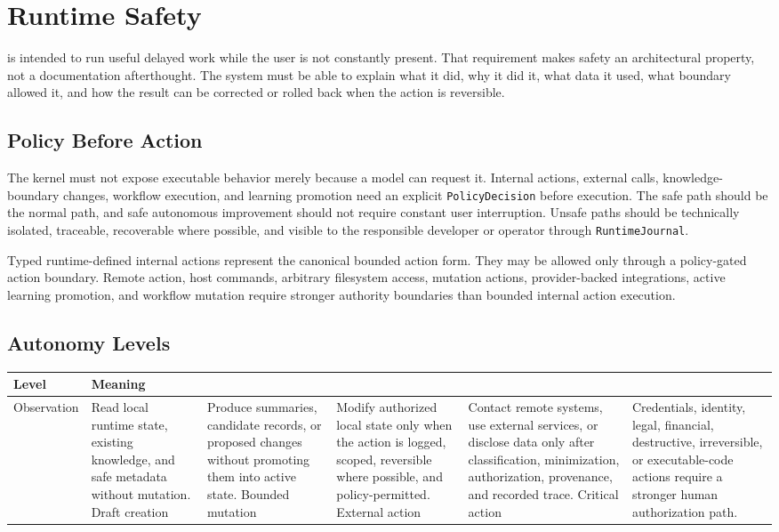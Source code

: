 

\section{Runtime Safety}

\Madre is intended to run useful delayed work while the user is not constantly present. That requirement makes safety an architectural property, not a documentation afterthought. The system must be able to explain what it did, why it did it, what data it used, what boundary allowed it, and how the result can be corrected or rolled back when the action is reversible.

\subsection{Policy Before Action}

The kernel must not expose executable behavior merely because a model can request it. Internal actions, external calls, knowledge-boundary changes, workflow execution, and learning promotion need an explicit \texttt{PolicyDecision} before execution. The safe path should be the normal path, and safe autonomous improvement should not require constant user interruption. Unsafe paths should be technically isolated, traceable, recoverable where possible, and visible to the responsible developer or operator through \texttt{RuntimeJournal}.

Typed runtime-defined internal actions represent the canonical bounded action form. They may be allowed only through a policy-gated action boundary. Remote action, host commands, arbitrary filesystem access, mutation actions, provider-backed integrations, active learning promotion, and workflow mutation require stronger authority boundaries than bounded internal action execution.

\subsection{Autonomy Levels}

\begin{tabularx}{.95\linewidth}{@{}lX@{}}
	\toprule
	\textbf{Level} & \textbf{Meaning} \\
	\midrule
	Observation & Read local runtime state, existing knowledge, and safe metadata without mutation. \n
	Draft creation & Produce summaries, candidate records, or proposed changes without promoting them into active state. \n
	Bounded mutation & Modify authorized local state only when the action is logged, scoped, reversible where possible, and policy-permitted. \n
	External action & Contact remote systems, use external services, or disclose data only after classification, minimization, authorization, provenance, and recorded trace. \n
	Critical action & Credentials, identity, legal, financial, destructive, irreversible, or executable-code actions require a stronger human authorization path. \\
	\bottomrule
\end{tabularx}

